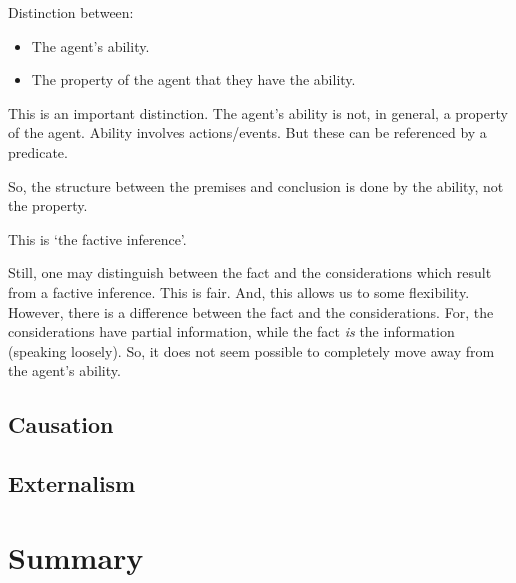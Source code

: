 \documentclass[10pt]{article}
\begin{document}
\begin{note}[Ability]
  Distinction between:
  \begin{itemize}
  \item The agent's ability.
  \item The property of the agent that they have the ability.
  \end{itemize}
  This is an important distinction.
  The agent's ability is not, in general, a property of the agent.
  Ability involves actions/events.
  But these can be referenced by a predicate.

  So, the structure between the premises and conclusion is done by the ability, not the property.

  This is `the factive inference'.

  Still, one may distinguish between the fact and the considerations which result from a factive inference.
  This is fair.
  And, this allows us to some flexibility.
  However, there is a difference between the fact and the considerations.
  For, the considerations have partial information, while the fact \emph{is} the information (speaking loosely).
  So, it does not seem possible to completely move away from the agent's ability.
  
\end{note}

\subsection{Causation}
\label{sec:causation}

\subsection{Externalism}
\label{sec:externalism}

\section{Summary}
\label{sec:summary}

\newpage
\end{document}
